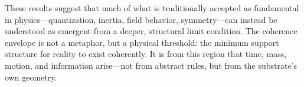 \documentclass[entropy,article,submit,pdftex,moreauthors]{Definitions/mdpi}
\begin{document}
These results suggest that much of what is traditionally accepted as fundamental in physics—quantization, inertia, field behavior, symmetry—can instead be understood as emergent from a deeper, structural limit condition. The coherence envelope is not a metaphor, but a physical threshold: the minimum support structure for reality to exist coherently. It is from this region that time, mass, motion, and information arise—not from abstract rules, but from the substrate’s own geometry.

\vspace{6pt} 




\end{document}
